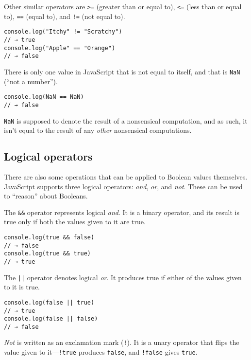 Other similar operators are \lstinline`>=` (greater than or equal to), \lstinline`<=` (less than or equal to), \lstinline`==` (equal to), and \lstinline`!=` (not equal to).

\begin{lstlisting}
console.log("Itchy" != "Scratchy")
// → true
console.log("Apple" == "Orange")
// → false
\end{lstlisting}
\noindent{}

There is only one value in JavaScript that is not equal to itself, and that is \lstinline`NaN` (``not a number'').

\begin{lstlisting}
console.log(NaN == NaN)
// → false
\end{lstlisting}
\noindent

\lstinline`NaN` is supposed to denote the result of a nonsensical computation, and as such, it isn't equal to the result of any \emph{other} nonsensical computations.

\subsection{Logical operators}

There are also some operations that can be applied to Boolean values themselves. JavaScript supports three logical operators: \emph{and}, \emph{or}, and \emph{not}. These can be used to ``reason'' about Booleans.

The \lstinline`&&` operator represents logical \emph{and}. It is a binary operator, and its result is true only if both the values given to it are true.

\begin{lstlisting}
console.log(true && false)
// → false
console.log(true && true)
// → true
\end{lstlisting}
\noindent{}

The \lstinline`||` operator denotes logical \emph{or}. It produces true if either of the values given to it is true.

\begin{lstlisting}
console.log(false || true)
// → true
console.log(false || false)
// → false
\end{lstlisting}
\noindent{}

\emph{Not} is written as an exclamation mark (\lstinline`!`). It is a unary operator that flips the value given to it—\lstinline`!true` produces \lstinline`false`, and \lstinline`!false` gives \lstinline`true`.

